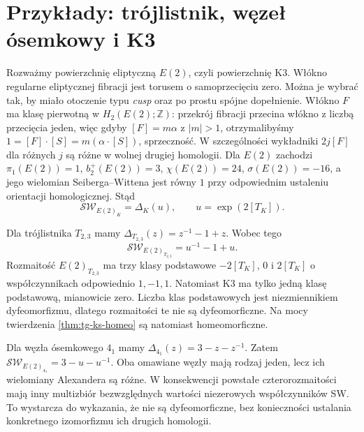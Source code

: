 \section{Przykłady: trójlistnik, węzeł ósemkowy i K3}
\label{sec:tg-ks-examples}

Rozważmy powierzchnię eliptyczną $E(2)$,
czyli powierzchnię K3. Włókno regularne
eliptycznej fibracji jest torusem o samoprzecięciu
zero. Można je wybrać tak, by miało otoczenie typu
\emph{cusp} oraz po prostu spójne dopełnienie.
Włókno $F$ ma klasę pierwotną w
$H_2(E(2);\mathbb Z)$: przekrój fibracji przecina
włókno z liczbą przecięcia jeden, więc gdyby
$[F]=m\alpha$ z $|m|>1$, otrzymalibyśmy
$1=[F]\cdot[S]=m(\alpha\cdot[S])$, sprzeczność.
W szczególności wykładniki $2j[F]$ dla różnych $j$
są różne w wolnej drugiej homologii.
Dla $E(2)$ zachodzi
$\pi_1(E(2))=1$, $b_2^+(E(2))=3$,
$\chi(E(2))=24$, $\sigma(E(2))=-16$, a jego
wielomian Seiberga--Wittena jest równy $1$ przy
odpowiednim ustaleniu orientacji homologicznej.
Stąd
\[
\mathcal{SW}_{E(2)_K}=\Delta_K(u),
\qquad u=\exp(2[T_K]).
\]

\begin{przyklad}
Dla trójlistnika $T_{2,3}$ mamy
$\Delta_{T_{2,3}}(z)=z^{-1}-1+z$. Wobec tego
\[
\mathcal{SW}_{E(2)_{T_{2,3}}}=u^{-1}-1+u.
\]
Rozmaitość $E(2)_{T_{2,3}}$ ma trzy klasy podstawowe
$-2[T_K]$, $0$ i $2[T_K]$ o współczynnikach
odpowiednio $1,-1,1$. Natomiast K3 ma tylko
jedną klasę podstawową, mianowicie zero.
Liczba klas podstawowych jest niezmiennikiem
dyfeomorfizmu, dlatego rozmaitości te nie są
dyfeomorficzne. Na mocy twierdzenia
\ref{thm:tg-ks-homeo} są natomiast homeomorficzne.
\end{przyklad}

\begin{przyklad}
Dla węzła ósemkowego $4_1$ mamy
$\Delta_{4_1}(z)=3-z-z^{-1}$.
Zatem
$\mathcal{SW}_{E(2)_{4_1}}=3-u-u^{-1}$.
Oba omawiane węzły mają rodzaj jeden, lecz
ich wielomiany Alexandera są różne.
W konsekwencji powstałe czterorozmaitości mają
inny multizbiór bezwzględnych wartości niezerowych
współczynników SW. To wystarcza do wykazania,
że nie są dyfeomorficzne, bez konieczności ustalania
konkretnego izomorfizmu ich drugich homologii.
\end{przyklad}

